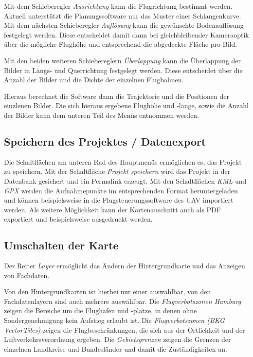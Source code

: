 \documentclass[a4paper,12pt,bibliography=totoc, listof=totoc,titlepage]{scrartcl}
\begin{document}
Mit dem Schieberegler \textit{Ausrichtung} kann die Flugrichtung bestimmt werden. Aktuell unterstützt die Planungssoftware nur das Muster einer Schlangenkurve. Mit dem nächsten Schieberegler \textit{Auflösung} kann die gewünschte Bodenauflösung festgelegt werden. Diese entscheidet damit dann bei gleichbleibender Kameraoptik über die mögliche Flughöhe und entsprechend die abgedeckte Fläche pro Bild.

Mit den beiden weiteren Schiebereglern \textit{Überlappung} kann die Überlappung der Bilder in Längs- und Querrichtung festgelegt werden. Diese entscheidet über die Anzahl der Bilder und die Dichte der einzelnen Flugbahnen.

Hieraus berechnet die Software dann die Trajektorie und die Positionen der einzlenen Bilder. Die sich hieraus ergebene Flughöhe und -länge, sowie die Anzahl der Bilder kann dem unteren Teil des Menüs entnommen werden.

\subsection{Speichern des Projektes / Datenexport}
Die Schaltflächen am unteren Rad des Hauptmenüs ermöglichen es, das Projekt zu speichern. Mit der Schaltfläche \textit{Projekt speichern} wird das Projekt in der Datenbank gesichert und ein Permalink erzeugt. Mit den Schaltflächen \textit{KML} und \textit{GPX} werden die Aufnahmepunkte im entsprechenden Format heruntergeladen und können beispielsweise in die Flugsteuerungssoftware des UAV importiert werden. Als weitere Möglichkeit kann der Kartenauschnitt auch als PDF exportiert und beispielsweise ausgedruckt werden.

\subsection{Umschalten der Karte}
Der Reiter \textit{Layer} ermöglicht das Ändern der Hintergrundkarte und das Anzeigen von Fachdaten.

Von den Hintergrundkarten ist hierbei nur einer auswählbar, von den Fachdatenlayern sind auch mehrere auswählbar. Die \textit{Flugverbotszonen Hamburg} zeigen die Bereiche um die Flughäfen und -plätze, in denen ohne Sondergenehmigung kein Aufstieg erlaubt ist. Die \textit{Flugverbotszonen (BKG VectorTiles)} zeigen die Flugbeschränkungen, die sich aus der Örtlichkeit und der Luftverkehrsverordnung ergeben. Die \textit{Gebietsgrenzen} zeigen die Grenzen der einzelnen Landkreise und Bundesländer und damit die Zuständigkeiten an.
\end{document}
